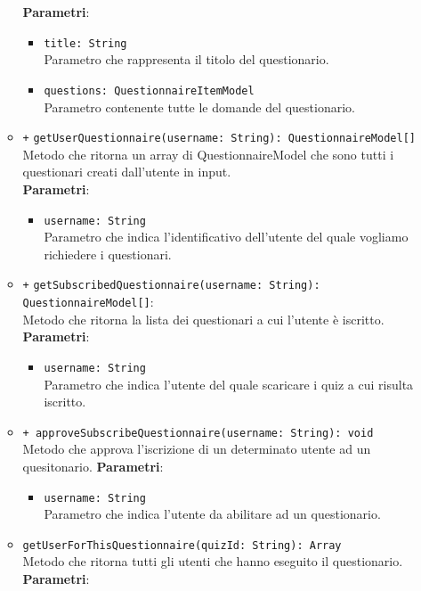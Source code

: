 \begin{itemize}
\begin{itemize}
	\textbf{Parametri}:
	\begin{itemize}
		\item \texttt{title: String} \\ Parametro che rappresenta il titolo del questionario.
		\item \texttt{questions: QuestionnaireItemModel} \\ Parametro contenente tutte le domande del questionario.
	\end{itemize}
	\item \texttt{+} \texttt{getUserQuestionnaire(username: String): QuestionnaireModel[]} \\Metodo che ritorna un array di QuestionnaireModel che sono tutti i questionari creati dall'utente in input.\\
	\textbf{Parametri}:
	\begin{itemize}
		\item \texttt{username: String} \\ Parametro che indica l'identificativo dell'utente del quale vogliamo richiedere i questionari.
	\end{itemize}
	\item \texttt{+} \texttt{getSubscribedQuestionnaire(username: String): QuestionnaireModel[]}: \\Metodo che ritorna la lista dei questionari a cui l'utente è iscritto.\\
	\textbf{Parametri}:
	\begin{itemize}
		\item \texttt{username: String} \\ Parametro che indica l'utente del quale scaricare i quiz a cui risulta iscritto.
	\end{itemize}
	\item \texttt{+ approveSubscribeQuestionnaire(username: String): void} \\ Metodo che approva l'iscrizione di un determinato utente ad un quesitonario.
	\textbf{Parametri}:
	\begin{itemize}
		\item \texttt{username: String} \\ Parametro che indica l'utente da abilitare ad un questionario.
	\end{itemize}
	\item \texttt{getUserForThisQuestionnaire(quizId: String): Array} \\ Metodo che ritorna tutti gli utenti che hanno eseguito il questionario.
	\textbf{Parametri}:
	\begin{itemize}

\end{itemize}
\end{itemize}
\end{itemize}
